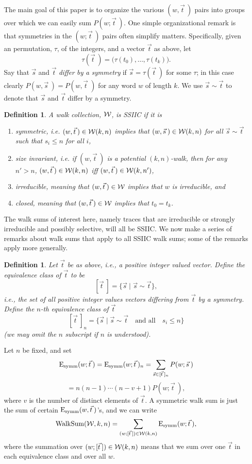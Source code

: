 \documentclass[12pt]{article}
\newtheorem{definition}[theorem]{Definition}
\newcommand{\walksum}[2]{{{\rm WalkSum}(#1,#2)}}
\newcommand{\cw}{{\cal W}}
\newcommand{\Esymm}{{\rm E}_{\rm symm}}
\begin{document}
The main goal of this paper is to organize the various $(w,\vec t\>)$ pairs
into groups over which we can easily sum $P(w;\vec t\>)$.  One simple
organizational remark is that symmetries in the $(w;\vec t\>)$ pairs
often simplify matters.  Specifically, given an permutation, $\tau$,
of the integers, and a vector $\vec t$ as above, let
$$
\tau(\vec t\>) = \bigl(\tau(t_0),\ldots,\tau(t_k)\bigr).
$$
Say that $\vec s$ and $\vec t$ {\em differ by a symmetry} if $\vec s=\tau
(\vec t\>)$ for some $\tau$; in this case clearly $P(w,\vec s\>)=P(w,\vec t\;)$
for any word $w$ of length $k$.  We use $\vec s\sim\vec t$ to denote
that $\vec s$ and $\vec t$ differ by a symmetry.

\begin{definition} A walk collection, $\cw$, is {\em SSIIC} if it is
\begin{enumerate}
\item {\em symmetric}, i.e. $(w,\vec t\>)\in\cw(k,n)$ implies that
$(w,\vec s\>)\in\cw(k,n)$ for all $\vec s\sim\vec t$ such that
$s_i\le n$ for all $i$,
\item {\em size invariant}, i.e. if $(w,\vec t\>)$ is a potential
$(k,n)$-walk, then for any $n'>n$, $(w,\vec t\>)\in\cw(k,n)$ iff
$(w,\vec t\>)\in\cw(k,n')$,
\item {\em irreducible}, meaning that $(w,\vec t\>)\in\cw$ implies that
$w$ is irreducible, and
\item {\em closed}, meaning that $(w,\vec t\>)\in\cw$ implies that
$t_0=t_k$.
\end{enumerate}
\end{definition}
The walk sums of interest here, namely traces that are irreducible
or strongly irreducible and possibly selective,
will all be SSIIC.
We now make a series of remarks about walk sums that apply to all
SSIIC walk sums; some of the remarks apply more generally.

\begin{definition}
Let $\vec t$ be as above, i.e., a positive integer valued vector.
Define the {\em equivalence class of $\vec t$} 
to be
$$
[\vec t\>] = \{ \vec s \mid \vec s\sim\vec t\},
$$
i.e., the set of all positive integer values vectors differing from
$\vec t$ by a symmetry.
Define the {\em $n$-th equivalence class of $\vec t$}
$$
[\vec t\>]_n = \{ \vec s \mid \vec s\sim\vec t \quad\mbox{and all}\quad
s_i\le n\}
$$
(we may omit the $n$ subscript if $n$ is understood).
\end{definition}
Let $n$ be fixed, and set
$$
\Esymm(w;\vec t\>) = \Esymm(w;\vec t\>)_n
= \sum_{\vec s\in[\vec t\>]_n} P(w;\vec s\>)
$$
$$
= n(n-1)\cdots(n-v+1)P(w;\vec t\>),
$$
where $v$ is the number of distinct elements of $\vec t$.  A symmetric
walk sum is just the sum of certain $\Esymm(w,\vec t\>)$'s, and we can
write
$$
\walksum{\cw}{k,n}=\sum_{(w;[\vec t\>])\in\cw(k,n)}\Esymm(w;\vec t\>),
$$
where 
the summation over $(w;[\vec t\>])\in\cw(k,n)$ means that
we sum over one $\vec t$
in each equivalence class and over all $w$.
\end{document}
